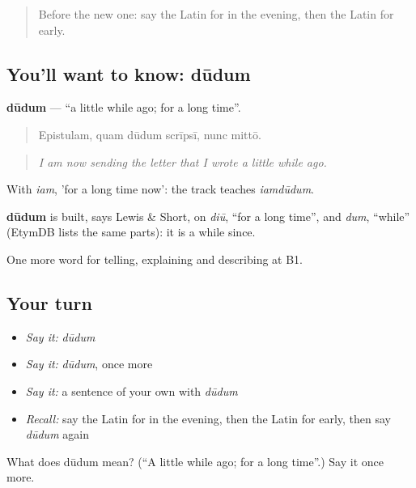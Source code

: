\label{lesson:LA-C295-dudum}



\begin{quote}
Before the new one: say the Latin for in the evening, then the Latin for early.
\end{quote}

\subsection*{You'll want to know: dūdum}
\textbf{dūdum} — \textquotedblleft{}a little while ago; for a long time\textquotedblright{}.

\begin{quote}
Epistulam, quam dūdum scrīpsī, nunc mittō.
\end{quote}

\begin{quote}
\emph{I am now sending the letter that I wrote a little while ago.}
\end{quote}

With \emph{iam}, 'for a long time now': the track teaches \emph{iamdūdum}.

\begin{cousinweb}
\textbf{dūdum} is built, says Lewis \& Short, on \emph{diū}, \textquotedblleft{}for a long time\textquotedblright{}, and \emph{dum}, \textquotedblleft{}while\textquotedblright{} (EtymDB lists the same parts): it is a while since.
\end{cousinweb}

\begin{grammarlens}[title={What you've built}]
One more word for telling, explaining and describing at B1.
\end{grammarlens}

\subsection*{Your turn}
\begin{itemize}
\raggedright
  \item \emph{Say it:} \emph{dūdum}
  \item \emph{Say it:} \emph{dūdum}, once more
  \item \emph{Say it:} a sentence of your own with \emph{dūdum}
  \item \emph{Recall:} say the Latin for in the evening, then the Latin for early, then say \emph{dūdum} again
\end{itemize}

\begin{tcolorbox}[breakable,colback=teal!4,colframe=teal!35!black,title={Before you move on}]
What does dūdum mean? (\textquotedblleft{}A little while ago; for a long time\textquotedblright{}.) Say it once more.
\end{tcolorbox}

